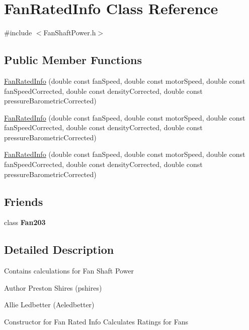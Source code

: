 \hypertarget{class_fan_rated_info}{}\section{Fan\+Rated\+Info Class Reference}
\label{class_fan_rated_info}


{\ttfamily \#include $<$Fan\+Shaft\+Power.\+h$>$}

\subsection*{Public Member Functions}
\begin{DoxyCompactItemize}
\item 
\hyperlink{class_fan_rated_info_aa76c95537bd1a0cd0159a8d45df76f18}{Fan\+Rated\+Info} (double const fan\+Speed, double const motor\+Speed, double const fan\+Speed\+Corrected, double const density\+Corrected, double const pressure\+Barometric\+Corrected)
\item 
\hyperlink{class_fan_rated_info_aa76c95537bd1a0cd0159a8d45df76f18}{Fan\+Rated\+Info} (double const fan\+Speed, double const motor\+Speed, double const fan\+Speed\+Corrected, double const density\+Corrected, double const pressure\+Barometric\+Corrected)
\item 
\hyperlink{class_fan_rated_info_aa76c95537bd1a0cd0159a8d45df76f18}{Fan\+Rated\+Info} (double const fan\+Speed, double const motor\+Speed, double const fan\+Speed\+Corrected, double const density\+Corrected, double const pressure\+Barometric\+Corrected)
\end{DoxyCompactItemize}
\subsection*{Friends}
\begin{DoxyCompactItemize}
\item 
\mbox{\label{class_fan_rated_info_ad537df0087a4a6f474dc9d50579cc33d}} 
class {\bfseries Fan203}
\end{DoxyCompactItemize}


\subsection{Detailed Description}
Contains calculations for Fan Shaft Power \begin{DoxyAuthor}{Author}
Preston Shires (pshires) 

Allie Ledbetter (Aeledbetter) 
\end{DoxyAuthor}
Constructor for Fan Rated Info Calculates Ratings for Fans

